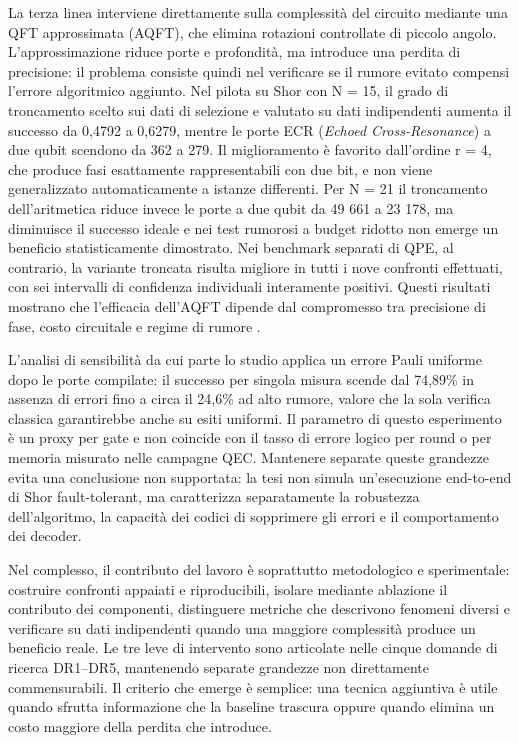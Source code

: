 La terza linea interviene direttamente sulla complessità del circuito mediante una QFT approssimata (AQFT), che elimina rotazioni controllate di piccolo angolo. L'approssimazione riduce porte e profondità, ma introduce una perdita di precisione: il problema consiste quindi nel verificare se il rumore evitato compensi l'errore algoritmico aggiunto. Nel pilota su Shor con N = 15, il grado di troncamento scelto sui dati di selezione e valutato su dati indipendenti aumenta il successo da 0,4792 a 0,6279, mentre le porte ECR (\textit{Echoed Cross-Resonance}) a due qubit scendono da 362 a 279. Il miglioramento è favorito dall'ordine r = 4, che produce fasi esattamente rappresentabili con due bit, e non viene generalizzato automaticamente a istanze differenti. Per N = 21 il troncamento dell'aritmetica riduce invece le porte a due qubit da 49 661 a 23 178, ma diminuisce il successo ideale e nei test rumorosi a budget ridotto non emerge un beneficio statisticamente dimostrato. Nei benchmark separati di QPE, al contrario, la variante troncata risulta migliore in tutti i nove confronti effettuati, con sei intervalli di confidenza individuali interamente positivi. Questi risultati mostrano che l'efficacia dell'AQFT dipende dal compromesso tra precisione di fase, costo circuitale e regime di rumore \cite{barencoAQFT1996,akoramurthy2026}.

L'analisi di sensibilità da cui parte lo studio applica un errore Pauli uniforme dopo le porte compilate: il successo per singola misura scende dal 74,89\% in assenza di errori fino a circa il 24,6\% ad alto rumore, valore che la sola verifica classica garantirebbe anche su esiti uniformi. Il parametro di questo esperimento è un proxy per gate e non coincide con il tasso di errore logico per round o per memoria misurato nelle campagne QEC. Mantenere separate queste grandezze evita una conclusione non supportata: la tesi non simula un'esecuzione end-to-end di Shor fault-tolerant, ma caratterizza separatamente la robustezza dell'algoritmo, la capacità dei codici di sopprimere gli errori e il comportamento dei decoder.

Nel complesso, il contributo del lavoro è soprattutto metodologico e sperimentale: costruire confronti appaiati e riproducibili, isolare mediante ablazione il contributo dei componenti, distinguere metriche che descrivono fenomeni diversi e verificare su dati indipendenti quando una maggiore complessità produce un beneficio reale. Le tre leve di intervento sono articolate nelle cinque domande di ricerca DR1--DR5, mantenendo separate grandezze non direttamente commensurabili. Il criterio che emerge è semplice: una tecnica aggiuntiva è utile quando sfrutta informazione che la baseline trascura oppure quando elimina un costo maggiore della perdita che introduce.

